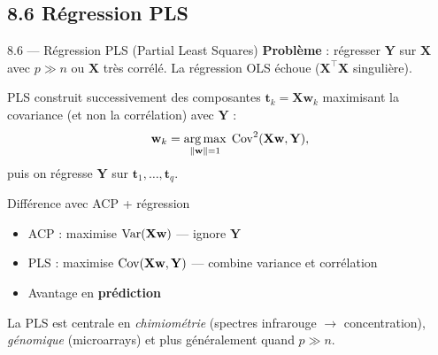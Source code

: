 \subsection{8.6 Régression PLS}
\begin{frame}{8.6 — Régression PLS (Partial Least Squares)}
\textbf{Problème} : régresser $\mathbf{Y}$ sur $\mathbf{X}$ avec $p \gg n$ ou
$\mathbf{X}$ très corrélé. La régression OLS échoue ($\mathbf{X}^\top \mathbf{X}$ singulière).

\begin{definition}
PLS construit successivement des composantes $\mathbf{t}_k = \mathbf{X}\mathbf{w}_k$
maximisant la \alert{covariance} (et non la corrélation) avec $\mathbf{Y}$ :
\[
\mathbf{w}_k = \operatorname*{arg\,max}_{\|\mathbf{w}\|=1}\; \operatorname{Cov}^2(\mathbf{X}\mathbf{w}, \mathbf{Y}),
\]
puis on régresse $\mathbf{Y}$ sur $\mathbf{t}_1, \ldots, \mathbf{t}_q$.
\end{definition}

\begin{block}{Différence avec ACP + régression}
\begin{itemize}\small
  \item ACP : maximise $\operatorname{Var}(\mathbf{X}\mathbf{w})$ — \alert{ignore} $\mathbf{Y}$
  \item PLS : maximise $\operatorname{Cov}(\mathbf{X}\mathbf{w}, \mathbf{Y})$ — combine variance et corrélation
  \item Avantage en \textbf{prédiction}
\end{itemize}
\end{block}

\begin{rema}
\small La PLS est centrale en \emph{chimiométrie} (spectres infrarouge $\to$
concentration), \emph{génomique} (microarrays) et plus généralement quand
$p \gg n$.
\end{rema}
\end{frame}

